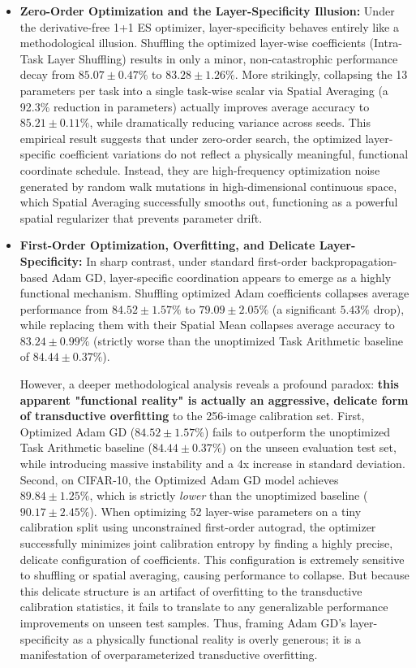 \begin{itemize}
    \item \textbf{Zero-Order Optimization and the Layer-Specificity Illusion:} Under the derivative-free 1+1 ES optimizer, layer-specificity behaves entirely like a methodological illusion. Shuffling the optimized layer-wise coefficients (Intra-Task Layer Shuffling) results in only a minor, non-catastrophic performance decay from $85.07 \pm 0.47\%$ to $83.28 \pm 1.26\%$. More strikingly, collapsing the 13 parameters per task into a single task-wise scalar via Spatial Averaging (a 92.3\% reduction in parameters) actually improves average accuracy to $85.21 \pm 0.11\%$, while dramatically reducing variance across seeds. This empirical result suggests that under zero-order search, the optimized layer-specific coefficient variations do not reflect a physically meaningful, functional coordinate schedule. Instead, they are high-frequency optimization noise generated by random walk mutations in high-dimensional continuous space, which Spatial Averaging successfully smooths out, functioning as a powerful spatial regularizer that prevents parameter drift.
    
    \item \textbf{First-Order Optimization, Overfitting, and Delicate Layer-Specificity:} In sharp contrast, under standard first-order backpropagation-based Adam GD, layer-specific coordination appears to emerge as a highly functional mechanism. Shuffling optimized Adam coefficients collapses average performance from $84.52 \pm 1.57\%$ to $79.09 \pm 2.05\%$ (a significant $5.43\%$ drop), while replacing them with their Spatial Mean collapses average accuracy to $83.24 \pm 0.99\%$ (strictly worse than the unoptimized Task Arithmetic baseline of $84.44 \pm 0.37\%$). 
    
    However, a deeper methodological analysis reveals a profound paradox: \textbf{this apparent "functional reality" is actually an aggressive, delicate form of transductive overfitting} to the 256-image calibration set. First, Optimized Adam GD ($84.52 \pm 1.57\%$) fails to outperform the unoptimized Task Arithmetic baseline ($84.44 \pm 0.37\%$) on the unseen evaluation test set, while introducing massive instability and a 4x increase in standard deviation. Second, on CIFAR-10, the Optimized Adam GD model achieves $89.84 \pm 1.25\%$, which is strictly \textit{lower} than the unoptimized baseline ($90.17 \pm 2.45\%$). When optimizing 52 layer-wise parameters on a tiny calibration split using unconstrained first-order autograd, the optimizer successfully minimizes joint calibration entropy by finding a highly precise, delicate configuration of coefficients. This configuration is extremely sensitive to shuffling or spatial averaging, causing performance to collapse. But because this delicate structure is an artifact of overfitting to the transductive calibration statistics, it fails to translate to any generalizable performance improvements on unseen test samples. Thus, framing Adam GD's layer-specificity as a physically functional reality is overly generous; it is a manifestation of overparameterized transductive overfitting.
    

\end{itemize}
